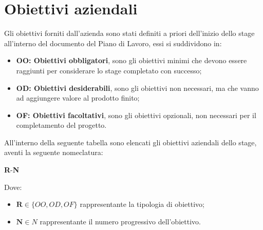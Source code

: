 \pagebreak
\section{Obiettivi aziendali}
\label{sez:obiettivi-aziendali}

Gli obiettivi forniti dall'azienda sono stati definiti a priori dell'inizio dello stage all'interno del documento del Piano di Lavoro, essi si suddividono in:
\begin{itemize}
    \item \textbf{OO: Obiettivi obbligatori}, sono gli obiettivi minimi che devono essere raggiunti per considerare lo stage completato con successo;
    \item \textbf{OD: Obiettivi desiderabili}, sono gli obiettivi non necessari, ma che vanno ad aggiungere valore al prodotto finito;
    \item \textbf{OF: Obiettivi facoltativi}, sono gli obiettivi opzionali, non necessari per il completamento del progetto.
\end{itemize}

\noindent All'interno della seguente tabella sono elencati gli obiettivi aziendali dello stage, aventi la seguente nomeclatura:

\begin{center}
    \textbf{R}-\textbf{N}
\end{center}

Dove:
\begin{itemize}
    \item $\textbf{R} \in  \{OO, OD, OF\}$ rappresentante la tipologia di obiettivo; \\
    \item $\textbf{N} \in N$ rappresentante il numero progressivo dell'obiettivo.
\end{itemize}


\renewcommand{\arraystretch}{1.5} %


